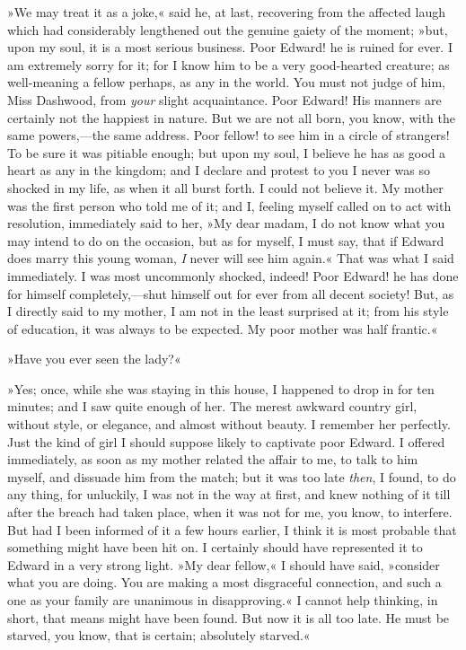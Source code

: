 »We may treat it as a joke,« said he, at last, recovering from the affected laugh which had considerably lengthened out the genuine gaiety of the moment; »but, upon my soul, it is a most serious business. Poor Edward! he is ruined for ever. I am extremely sorry for it; for I know him to be a very good-hearted creature; as well-meaning a fellow perhaps, as any in the world. You must not judge of him, Miss Dashwood, from \textit{your} slight acquaintance. Poor Edward! His manners are certainly not the happiest in nature. But we are not all born, you know, with the same powers,—the same address. Poor fellow! to see him in a circle of strangers! To be sure it was pitiable enough; but upon my soul, I believe he has as good a heart as any in the kingdom; and I declare and protest to you I never was so shocked in my life, as when it all burst forth. I could not believe it. My mother was the first person who told me of it; and I, feeling myself called on to act with resolution, immediately said to her, »My dear madam, I do not know what you may intend to do on the occasion, but as for myself, I must say, that if Edward does marry this young woman, \textit{I} never will see him again.« That was what I said immediately. I was most uncommonly shocked, indeed! Poor Edward! he has done for himself completely,—shut himself out for ever from all decent society! But, as I directly said to my mother, I am not in the least surprised at it; from his style of education, it was always to be expected. My poor mother was half frantic.«

»Have you ever seen the lady?«

»Yes; once, while she was staying in this house, I happened to drop in for ten minutes; and I saw quite enough of her. The merest awkward country girl, without style, or elegance, and almost without beauty. I remember her perfectly. Just the kind of girl I should suppose likely to captivate poor Edward. I offered immediately, as soon as my mother related the affair to me, to talk to him myself, and dissuade him from the match; but it was too late \textit{then}, I found, to do any thing, for unluckily, I was not in the way at first, and knew nothing of it till after the breach had taken place, when it was not for me, you know, to interfere. But had I been informed of it a few hours earlier, I think it is most probable that something might have been hit on. I certainly should have represented it to Edward in a very strong light. »My dear fellow,« I should have said, »consider what you are doing. You are making a most disgraceful connection, and such a one as your family are unanimous in disapproving.« I cannot help thinking, in short, that means might have been found. But now it is all too late. He must be starved, you know, that is certain; absolutely starved.«

